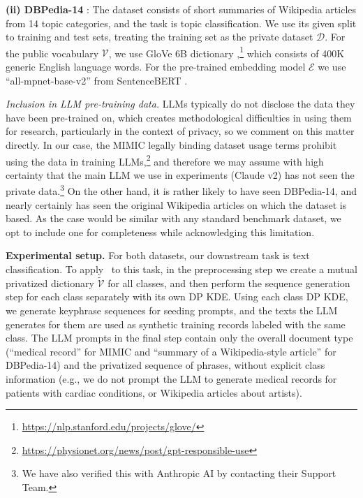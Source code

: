 \noindent\textbf{(ii) DBPedia-14} \cite{NIPS2015_250cf8b5}: The dataset consists of short summaries of Wikipedia articles from 14 topic categories, and the task is topic classification. We use its given split to training and test sets, treating the training set as the private dataset $\mathcal D$. 
For the public vocabulary $\mathcal V$, we use GloVe 6B dictionary \cite{pennington2014glove},\footnote{\url{https://nlp.stanford.edu/projects/glove/}} which consists of 400K generic English language words. For the pre-trained embedding model $\mathcal E$ we use ``all-mpnet-base-v2'' from SentenceBERT \cite{reimers2019sentence}.


\noindent\textit{Inclusion in LLM pre-training data.} 
LLMs typically do not disclose the data they have been pre-trained on, which creates methodological difficulties in using them for research, particularly in the context of privacy, so we comment on this matter directly. In our case, the MIMIC legally binding dataset usage terms prohibit using the data in training LLMs,\footnote{\url{https://physionet.org/news/post/gpt-responsible-use}} 
and therefore we may assume with high certainty that the main LLM we use in experiments (Claude v2) has not seen the private data.\footnote{We have also verified this with Anthropic AI by contacting their Support Team.} 
On the other hand, it is rather likely to have seen DBPedia-14, and nearly certainly has seen the original Wikipedia articles on which the dataset is based. 
As the case would be similar with any standard benchmark dataset, we opt to include one for completeness while acknowledging this limitation. 

\noindent\textbf{Experimental setup.}
For both datasets, our downstream task is text classification. To apply \alg\ to this task, in the preprocessing step we create a mutual privatized dictionary $\widetilde{\mathcal{V}}$ for all classes, and then perform the sequence generation step for each class separately with its own DP KDE. Using each class DP KDE, we generate keyphrase sequences for seeding prompts, and the texts the LLM generates for them are used as synthetic training records labeled with the same class. 
The LLM prompts in the final step contain only the overall document type (``medical record'' for MIMIC and ``summary of a Wikipedia-style article'' for DBPedia-14) and the privatized sequence of phrases, without explicit class information (e.g., we do not prompt the LLM to generate medical records for patients with cardiac conditions, or Wikipedia articles about artists). 

